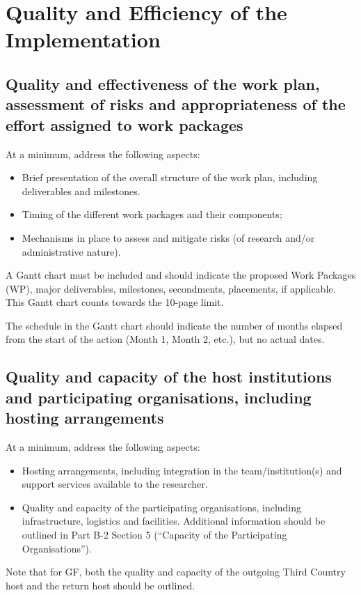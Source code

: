 \documentclass[12pt,draftproposal]{msca-pf}
\begin{document}
\section{Quality and Efficiency of the Implementation}
\label{sc:implementation}

\subsection{Quality and effectiveness of the work plan, assessment of risks and
    appropriateness of the effort assigned to work packages}
\label{ssc:implementation:workplan}

\begin{mscaexplanation}
At a minimum, address the following aspects:

\begin{itemize}
    \item Brief presentation of the overall structure of the work plan,
    including deliverables and milestones.

    \item Timing of the different work packages and their components;

    \item Mechanisms in place to assess and mitigate risks (of research and/or
    administrative nature).
\end{itemize}

A Gantt chart must be included and should indicate the proposed Work Packages
(WP), major deliverables, milestones, secondments, placements, if applicable.
This Gantt chart counts towards the 10-page limit.

The schedule in the Gantt chart should indicate the number of months elapsed
from the start of the action (Month 1, Month 2, etc.), but no actual dates.
\end{mscaexplanation}

\subsection{Quality and capacity of the host institutions and participating
organisations, including hosting arrangements}
\label{ssc:implementation:host}

\begin{mscaexplanation}
At a minimum, address the following aspects:

\begin{itemize}
    \item Hosting arrangements, including integration in the team/institution(s)
    and support services available to the researcher.

    \item Quality and capacity of the participating organisations, including
    infrastructure, logistics and facilities. Additional information should be
    outlined in Part B-2 Section 5 (``Capacity of the Participating Organisations'').
\end{itemize}

Note that for GF, both the quality and capacity of the outgoing Third Country
host and the return host should be outlined.
\end{mscaexplanation}
\end{document}
